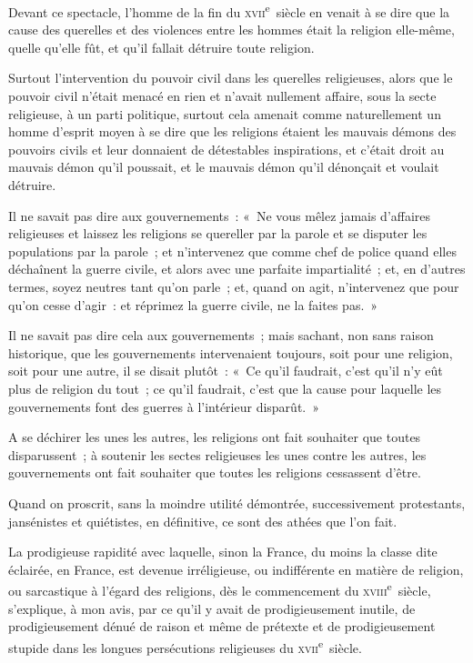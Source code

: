 \documentclass[french,twoside]{book} %
\begin{document}
Devant ce spectacle, l’homme de la fin du \textsc{xvii}\textsuperscript{e} siècle en venait à se dire que la cause des querelles et des violences entre les hommes était la  religion elle-même, quelle qu’elle fût, et qu’il fallait détruire toute religion.\par
Surtout l’intervention du pouvoir civil dans les querelles religieuses, alors que le pouvoir civil n’était menacé en rien et n’avait nullement affaire, sous la secte religieuse, à un parti politique, surtout cela amenait comme naturellement un homme d’esprit moyen à se dire que les religions étaient les mauvais démons des pouvoirs civils et leur donnaient de détestables inspirations, et c’était droit au mauvais démon qu’il poussait, et le mauvais démon qu’il dénonçait et voulait détruire.\par
Il ne savait pas dire aux gouvernements : « Ne vous mêlez jamais d’affaires religieuses et laissez les religions se quereller par la parole et se disputer les populations par la parole ; et n’intervenez que comme chef de police quand elles déchaînent la guerre civile, et alors avec une parfaite impartialité ; et, en d’autres termes, soyez neutres tant qu’on parle ; et, quand on agit, n’intervenez que pour qu’on cesse d’agir : et réprimez la guerre civile, ne la faites pas. »\par
Il ne savait pas dire cela aux gouvernements ; mais sachant, non sans raison historique, que les gouvernements intervenaient toujours, soit pour une religion, soit pour une autre, il se disait plutôt : « Ce qu’il faudrait, c’est qu’il n’y eût plus de  religion du tout ; ce qu’il faudrait, c’est que la cause pour laquelle les gouvernements font des guerres à l’intérieur disparût. »\par
A se déchirer les unes les autres, les religions ont fait souhaiter que toutes disparussent ; à soutenir les sectes religieuses les unes contre les autres, les gouvernements ont fait souhaiter que toutes les religions cessassent d’être.\par
Quand on proscrit, sans la moindre utilité démontrée, successivement protestants, jansénistes et quiétistes, en définitive, ce sont des athées que l’on fait.\par
La prodigieuse rapidité avec laquelle, sinon la France, du moins la classe dite éclairée, en France, est devenue irréligieuse, ou indifférente en matière de religion, ou sarcastique à l’égard des religions, dès le commencement du \textsc{xviii}\textsuperscript{e} siècle, s’explique, à mon avis, par ce qu’il y avait de prodigieusement inutile, de prodigieusement dénué de raison et même de prétexte et de prodigieusement stupide dans les longues persécutions religieuses du \textsc{xvii}\textsuperscript{e} siècle.
\end{document}
